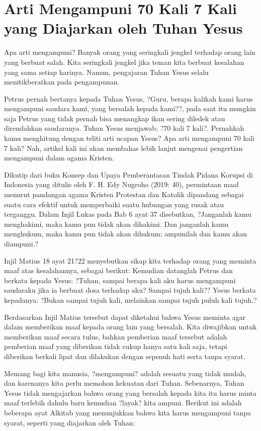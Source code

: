 \documentclass[11pt,a5paper]{article}
\author{Yohanes Suyanto}
\begin{document}
\section*{Arti Mengampuni 70 Kali 7 Kali yang Diajarkan oleh Tuhan Yesus
}

Apa arti mengampuni? Banyak orang yang seringkali jengkel terhadap orang lain yang berbuat salah. Kita seringkali jengkel jika teman kita berbuat kesalahan yang sama setiap harinya. Namun, pengajaran Tuhan Yesus selalu menitikberatkan pada pengampunan. 

Petrus pernah bertanya kepada Tuhan Yesus, ?Guru, berapa kalikah kami harus mengampuni saudara kami, yang bersalah kepada kami??, pada saat itu mungkin saja Petrus yang tidak pernah bisa menangkap ikan sering diledek atau direndahkan saudaranya. Tuhan Yesus menjawab; ?70 kali 7 kali?. Pernahkah kamu menghitung dengan teliti arti ucapan Yesus? Apa arti mengampuni 70 kali 7 kali? Nah, artikel kali ini akan membahas lebih lanjut mengenai pengertian mengampuni dalam agama Kristen.

Dikutip dari buku Konsep dan Upaya Pemberantasan Tindak Pidana Korupsi di Indonesia yang ditulis oleh F. H. Edy Nugroho (2019: 40), permintaan maaf menurut pandangan agama Kristen Protestan dan Katolik dipandang sebagai suatu cara efektif untuk memperbaiki suatu hubungan yang rusak atau terganggu. Dalam Injil Lukas pada Bab 6 ayat 37 disebutkan, ?Janganlah kamu menghakimi, maka kamu pun tidak akan dihakimi. Dan janganlah kamu menghukum, maka kamu pun tidak akan dihukum; ampunilah dan kamu akan diampuni.?

Injil Matius 18 ayat 21?22 menyebutkan sikap kita terhadap orang yang meminta maaf atas kesalahannya, sebagai berikut:
Kemudian datanglah Petrus dan berkata kepada Yesus: ?Tuhan, sampai berapa kali aku harus mengampuni saudaraku jika ia berbuat dosa terhadap aku? Sampai tujuh kali?? Yesus berkata kepadanya: ?Bukan sampai tujuh kali, melainkan sampai tujuh puluh kali tujuh.?

Berdasarkan Injil Matius tersebut dapat diketahui bahwa Yesus meminta agar dalam memberikan maaf kepada orang lain yang bersalah. Kita diwajibkan untuk memberikan maaf secara tulus, bahkan pemberian maaf tersebut adalah pemberian maaf yang diberikan tidak cukup hanya satu kali saja, tetapi diberikan berkali lipat dan dilakukan dengan sepenuh hati serta tanpa syarat.

Memang bagi kita manusia, ?mengampuni? adalah sesuatu yang tidak mudah, dan karenanya kita perlu memohon kekuatan dari Tuhan. Sebenarnya, Tuhan Yesus tidak mengajarkan bahwa orang yang bersalah kepada kita itu harus minta maaf terlebih dahulu baru kemudian ?layak? kita ampuni. Berikut ini adalah beberapa ayat Alkitab yang menunjukkan bahwa kita harus mengampuni tanpa syarat, seperti yang diajarkan oleh Tuhan:
\end{document}
